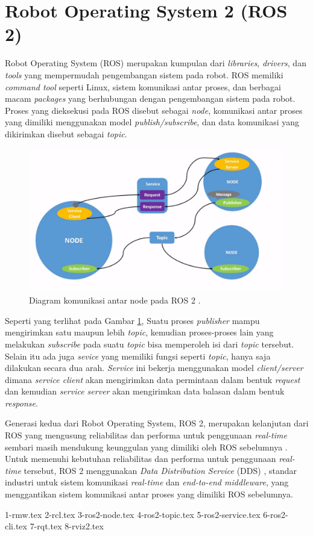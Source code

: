 \section{Robot Operating System 2 (ROS 2)}
\label{sec:ros2}

Robot Operating System (ROS) \citep{cit:quigley2009} merupakan kumpulan dari \emph{libraries}, \emph{drivers}, dan \emph{tools} yang mempermudah pengembangan sistem pada robot.
ROS memiliki \emph{command tool} seperti Linux, sistem komunikasi antar proses, dan berbagai macam \emph{packages} yang berhubungan dengan pengembangan sistem pada robot.
Proses yang dieksekusi pada ROS disebut sebagai \emph{node}, komunikasi antar proses yang dimiliki menggunakan model \emph{publish/subscribe}, dan data komunikasi yang dikirimkan disebut sebagai \emph{topic}.

\begin{figure}[ht]
  \centering
	\includegraphics[scale=0.4]{gambar/komunikasi-ros.png}
	\caption{Diagram komunikasi antar node pada ROS 2 \citep{url:ros2nodes}.}
	\label{fig:komunikasiros}
\end{figure}

Seperti yang terlihat pada Gambar \ref{fig:komunikasiros}, Suatu proses \emph{publisher} mampu mengirimkan satu maupun lebih \emph{topic}, kemudian proses-proses lain yang melakukan \emph{subscribe} pada suatu \emph{topic} bisa memperoleh isi dari \emph{topic} tersebut.
Selain itu ada juga \emph{sevice} yang memiliki fungsi seperti \emph{topic}, hanya saja dilakukan secara dua arah.
\emph{Service} ini bekerja menggunakan model \emph{client/server} dimana \emph{service client} akan mengirimkan data permintaan dalam bentuk \emph{request} dan kemudian \emph{service server} akan mengirimkan data balasan dalam bentuk \emph{response}.

Generasi kedua dari Robot Operating System, ROS 2, merupakan kelanjutan dari ROS yang mengusung reliabilitas dan performa untuk penggunaan \emph{real-time} sembari masih mendukung keunggulan yang dimiliki oleh ROS sebelumnya \citep{cit:maruyama2016}.
Untuk memenuhi kebutuhan reliabilitas dan performa untuk penggunaan \emph{real-time} tersebut, ROS 2 menggunakan \emph{Data Distribution Service} (DDS) \citep{cit:castellote2003} \citep{cit:schlesselman2004}, standar industri untuk sistem komunikasi \emph{real-time} dan \emph{end-to-end middleware}, yang menggantikan sistem komunikasi antar proses yang dimiliki ROS sebelumnya.

{1-rmw.tex}
{2-rcl.tex}
{3-ros2-node.tex}
{4-ros2-topic.tex}
{5-ros2-service.tex}
{6-ros2-cli.tex}
{7-rqt.tex}
{8-rviz2.tex}
